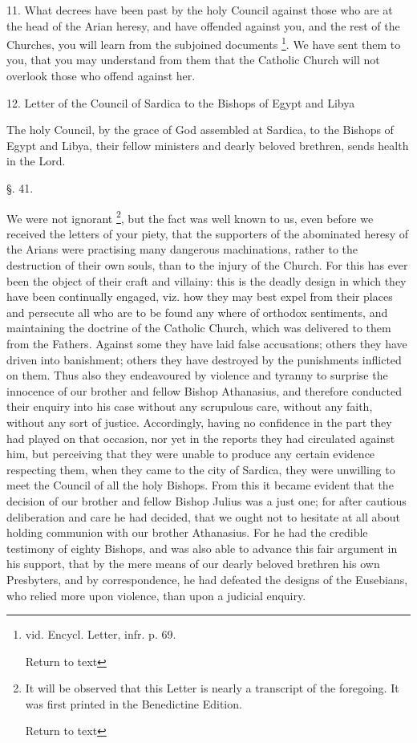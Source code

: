 11. What decrees have been past by the holy
Council against those who are at the head of the Arian heresy, and
have offended against you, and the rest of the Churches, you will
learn from the subjoined documents \footnote{vid. Encycl. Letter, infr. p. 69.

Return to text}. We have sent them to
you, that you may understand from them that the Catholic Church will
not overlook those who offend against her.

12. Letter of the Council of Sardica to the
Bishops of Egypt and Libya

The holy Council, by the grace of God assembled
at Sardica, to the Bishops of Egypt and Libya, their fellow ministers
and dearly beloved brethren, sends health in the Lord.

§. 41.

We were not ignorant \footnote{It will be observed that this Letter is nearly
a transcript of the foregoing. It was first printed in the Benedictine
Edition.

Return to text}, but the fact was
well known to us, even before we received the letters of your piety,
that the supporters of the abominated heresy of the Arians were
practising many dangerous machinations, rather to the destruction of
their own souls, than to the injury of the Church. For this has ever
been the object of their craft and villainy: this is the deadly design
in which they have been continually engaged, viz. how they may best
expel from their places and persecute all who are to be found any
where of orthodox sentiments, and maintaining the doctrine of the
Catholic Church, which was delivered to them from the Fathers. Against
some they have laid false accusations; others they have driven into
banishment; others they have destroyed by the punishments inflicted on
them. Thus also they endeavoured by violence and tyranny to surprise
the innocence of our brother and fellow Bishop Athanasius, and
therefore conducted their enquiry into his case without any scrupulous
care, without any faith, without any sort of justice. Accordingly,
having no confidence in the part they had played on that occasion, nor
yet in the reports they had circulated against him, but perceiving
that they were unable to produce any certain evidence respecting them,
when they came to the city of Sardica, they were unwilling to meet the
Council of all the holy Bishops. From this it became evident that the
decision of our brother and fellow Bishop Julius was a just one;
for after cautious deliberation and care he had decided, that we ought
not to hesitate at all about holding communion with our brother
Athanasius. For he had the credible testimony of eighty Bishops, and
was also able to advance this fair argument in his support, that by
the mere means of our dearly beloved brethren his own Presbyters, and
by correspondence, he had defeated the designs of the Eusebians, who
relied more upon violence, than upon a judicial enquiry.

